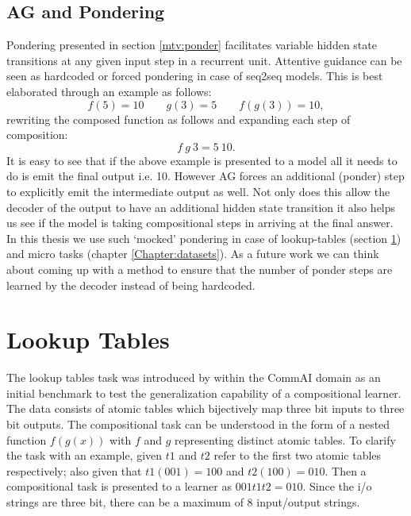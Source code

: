 \subsection{AG and Pondering} \label{pm:ag-ponder}
Pondering presented in section \ref{mtv:ponder} facilitates variable hidden state transitions at any given input step in a recurrent unit. Attentive guidance can be seen as hardcoded or forced pondering in case of seq2seq models. This is best elaborated through an example as follows:
\begin{equation}
	f(5) = 10 \qquad g(3) = 5\qquad f(g(3)) = 10,
\end{equation}
rewriting the composed function as follows and expanding each step of composition:
\begin{equation}
	f\ g\ 3 = 5\ 10.
\end{equation}
It is easy to see that if the above example is presented to a model all it needs to do is emit the final output i.e. 10. However AG forces an additional (ponder) step to explicitly emit the intermediate output as well. Not only does this allow the decoder of the output to have an additional hidden state transition it also helps us see if the model is taking compositional steps in arriving at the final answer. In this thesis we use such \lq mocked\rq{} pondering in case of lookup-tables (section \ref{datasets:lt}) and micro tasks (chapter \ref{Chapter:datasets}). As a future work we can think about coming up with a method to ensure that the number of ponder steps are learned by the decoder instead of being hardcoded.

\section{Lookup Tables} \label{datasets:lt}

The lookup tables task was introduced by \cite{Liska2018} within the CommAI domain \citep{Baroni2017} as an initial benchmark to test the generalization capability of a compositional learner. The data consists of atomic tables which bijectively map three bit inputs to three bit outputs. The compositional task can be understood in the form of a nested function $f(g(x))$ with $f$ and $g$ representing distinct atomic tables. To clarify the task with an example, given $t1$ and $t2$ refer to the first two atomic tables respectively; also given that $t1(001) = 100$ and $t2(100) = 010$. Then a compositional task is presented to a learner as $001 t1 t2 = 010$. Since the i/o strings are three bit, there can be a maximum of 8 input/output strings.


